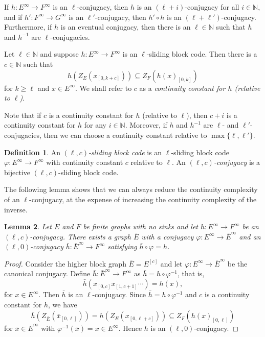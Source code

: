 \documentclass[12pt,a4paper,oneside,reqno,final]{amsart}
\newcommand{\LRA}{\longrightarrow}
\newcommand{\N}{\mathbb{N}}
\let\geq\geqslant{}
\let\subset\subseteq{}
\newtheorem{lemma}{Lemma}[section] %
\theoremstyle{definition}
\newtheorem{definition}[lemma]{Definition}
\numberwithin{equation}{section} %
\begin{document}
If $h\colon E^\infty \LRA F^{\infty}$ is an $\ell$-conjugacy, then $h$ is an $(\ell + i)$-conjugacy for all $i\in \N$, and
if $h'\colon F^\infty\LRA G^\infty$ is an $\ell'$-conjugacy, then $h'\circ h$ is an $(\ell + \ell')$-conjugacy.
Furthermore, if $h$ is an eventual conjugacy, then there is an $\ell\in \N$ such that $h$ and $h^{-1}$ are $\ell$-conjugacies.


Let $\ell\in \N$ and suppose $h\colon E^\infty\LRA F^\infty$ is an $\ell$-sliding block code.
Then there is a $c\in \N$ such that
\begin{equation}\label{eq:continuity-constant}
    h(Z_E(x_{[0, k + c]})) \subset Z_F({h(x)}_{[0, k]})
\end{equation}
for $k\geq \ell$ and $x\in E^\infty$.
We shall refer to $c$ as a \emph{continuity constant for $h$ (relative to $\ell$)}.   

Note that if $c$ is a continuity constant for $h$ (relative to $\ell$), then $c + i$ is a continuity constant for $h$ for any $i\in \N$.
Moreover, if $h$ and $h^{-1}$ are $\ell$- and $\ell'$-conjugacies, then we can choose a continuity constant relative to $\max\{\ell, \ell'\}$.



\begin{definition}
    An \emph{$(\ell, c)$-sliding block code} is an $\ell$-sliding block code $\varphi\colon E^\infty\LRA F^\infty$ with continuity constant $c$ relative to $\ell$.
    An \emph{$(\ell, c)$-conjugacy} is a bijective $(\ell, c)$-sliding block code.
\end{definition}

The following lemma shows that we can always reduce the continuity complexity of an $\ell$-conjugacy,
at the expense of increasing the continuity complexity of the inverse.

\begin{lemma}
    Let $E$ and $F$ be finite graphs with no sinks and let $h\colon E^\infty\LRA F^\infty$ be an $(\ell, c)$-conjugacy.
    There exists a graph $\bar{E}$ with a conjugacy $\varphi\colon E^\infty \LRA {\bar{E}}^\infty$
    and an $(\ell, 0)$-conjugacy $\bar{h}\colon \bar{E}^\infty\LRA F^\infty$ satisfying $\bar{h}\circ \varphi = h$.
\end{lemma}

\begin{proof}
    Consider the higher block graph $\bar{E} = E^{[c]}$ and let $\varphi\colon E^\infty\LRA {\bar{E}}^\infty$ be the canonical conjugacy.
    Define $\bar{h}\colon \bar{E}^\infty\LRA F^\infty$ as $\bar{h} = h\circ \varphi^{-1}$, that is,
    \[
        \bar{h}(x_{[0, c]} x_{[1, c + 1]} \cdots) = h(x),
    \]
    for $x\in E^\infty$.
    Then $\bar{h}$ is an $\ell$-conjugacy.
    Since $\bar{h} = h\circ \varphi^{-1}$ and $c$ is a continuity constant for $h$, we have 
    \[
        \bar{h}(Z_{\bar{E}}(\bar{x}_{[0, \ell]})) = h(Z_E(x_{[0, \ell + c]})) \subset Z_F(h(x)_{[0, \ell]})
    \]
    for $\bar{x}\in {\bar{E}}^\infty$ with $\varphi^{-1}(\bar{x}) = x\in E^\infty$.
    Hence $\bar{h}$ is an $(\ell, 0)$-conjugacy.
\end{proof}
\end{document}
